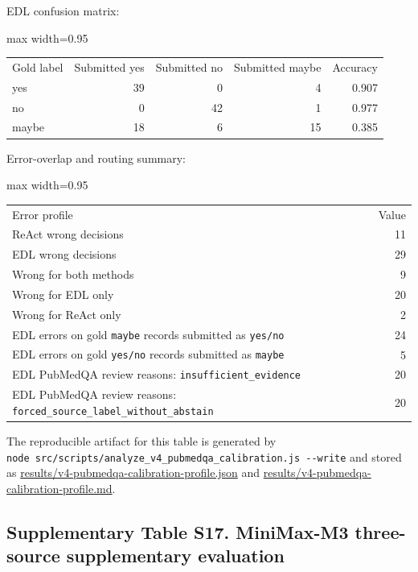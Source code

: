 \documentclass[
  8pt,
]{extarticle}
\begin{document}
EDL confusion matrix:

\begin{center}
\begin{adjustbox}{max width=0.95\textwidth}
\begin{tabular}{@{}
lrrrr@{}}
\toprule\noalign{}
Gold label & Submitted yes & Submitted no & Submitted maybe &
Accuracy \\

yes & 39 & 0 & 4 & 0.907 \\
no & 0 & 42 & 1 & 0.977 \\
maybe & 18 & 6 & 15 & 0.385 \\
\bottomrule
\end{tabular}
\end{adjustbox}
\end{center}

Error-overlap and routing summary:

\begin{center}
\begin{adjustbox}{max width=0.95\textwidth}
\begin{tabular}{@{}
lr@{}}
\toprule\noalign{}
Error profile & Value \\

ReAct wrong decisions & 11 \\
EDL wrong decisions & 29 \\
Wrong for both methods & 9 \\
Wrong for EDL only & 20 \\
Wrong for ReAct only & 2 \\
EDL errors on gold \texttt{maybe} records submitted as \texttt{yes/no} &
24 \\
EDL errors on gold \texttt{yes/no} records submitted as \texttt{maybe} &
5 \\
EDL PubMedQA review reasons: \texttt{insufficient\_evidence} & 20 \\
EDL PubMedQA review reasons:
\texttt{forced\_source\_label\_without\_abstain} & 20 \\
\bottomrule
\end{tabular}
\end{adjustbox}
\end{center}

The reproducible artifact for this table is generated by
\texttt{node\ src/scripts/analyze\_v4\_pubmedqa\_calibration.js\ -\/-write}
and stored as \url{results/v4-pubmedqa-calibration-profile.json} and
\url{results/v4-pubmedqa-calibration-profile.md}.

\hypertarget{supplementary-table-s17-minimax-m3-three-source-supplementary-evaluation}{%
\subsection{Supplementary Table S17. MiniMax-M3 three-source
supplementary
evaluation}\label{supplementary-table-s17-minimax-m3-three-source-supplementary-evaluation}}
\end{document}
